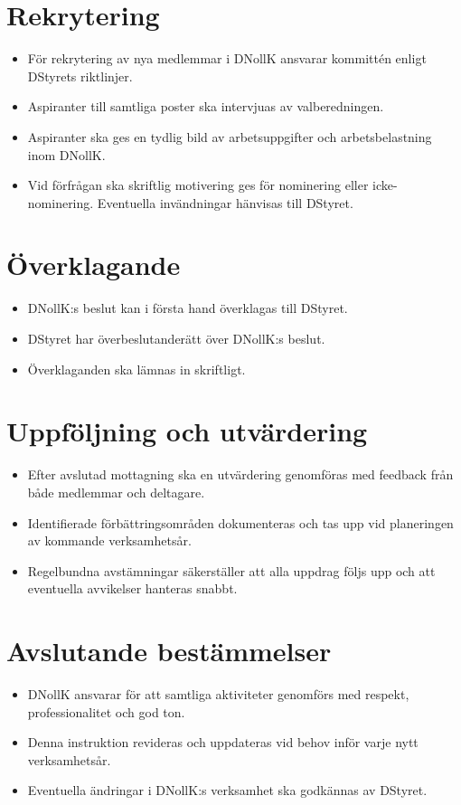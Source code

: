 \documentclass[a4paper]{dtekinstruktion}
\begin{document}
\section{Rekrytering}
\begin{itemize}
  \item För rekrytering av nya medlemmar i DNollK ansvarar kommittén enligt DStyrets riktlinjer.
  \item Aspiranter till samtliga poster ska intervjuas av valberedningen.
  \item Aspiranter ska ges en tydlig bild av arbetsuppgifter och arbetsbelastning inom DNollK.
  \item Vid förfrågan ska skriftlig motivering ges för nominering eller icke-nominering. Eventuella invändningar hänvisas till DStyret.
\end{itemize}

\section{Överklagande}
\begin{itemize}
  \item DNollK:s beslut kan i första hand överklagas till DStyret.
  \item DStyret har överbeslutanderätt över DNollK:s beslut.
  \item Överklaganden ska lämnas in skriftligt.
\end{itemize}

\section{Uppföljning och utvärdering}
\begin{itemize}
  \item Efter avslutad mottagning ska en utvärdering genomföras med feedback från både medlemmar och deltagare.
  \item Identifierade förbättringsområden dokumenteras och tas upp vid planeringen av kommande verksamhetsår.
  \item Regelbundna avstämningar säkerställer att alla uppdrag följs upp och att eventuella avvikelser hanteras snabbt.
\end{itemize}

\section{Avslutande bestämmelser}
\begin{itemize}
  \item DNollK ansvarar för att samtliga aktiviteter genomförs med respekt, professionalitet och god ton.
  \item Denna instruktion revideras och uppdateras vid behov inför varje nytt verksamhetsår.
  \item Eventuella ändringar i DNollK:s verksamhet ska godkännas av DStyret.
\end{itemize}
\end{document}
